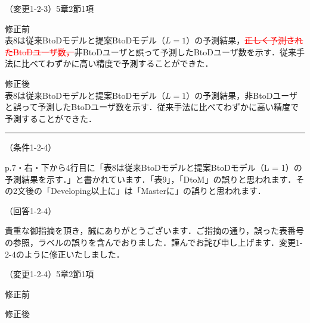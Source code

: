 \documentclass{jarticle} %
\def\subsection#1{ \vspace{1pc} {\gt #1} }
\def\nextans{ \vspace{2pc} \hrule }
\begin{document}
\subsection{（変更1-2-3）5章2節1項}
\vspace{-0.3cm}
\begin{description}
\item 修正前\\
\phantom{　}
表8は従来BtoDモデルと提案BtoDモデル（$L=1$）の予測結果，\textcolor{red}{\sout{正しく予測されたBtoDユーザ数，}}非BtoDユーザと誤って予測したBtoDユーザ数を示す．従来手法に比べてわずかに高い精度で予測することができた．
\vspace{-0.3cm}
\item 修正後\\
\phantom{　}
表8は従来BtoDモデルと提案BtoDモデル（$L=1$）の予測結果，非BtoDユーザと誤って予測したBtoDユーザ数を示す．従来手法に比べてわずかに高い精度で予測することができた．
\end{description}

\newpage
\nextans
\subsection{（条件1-2-4）}

p.7・右・下から4行目に「表8は従来BtoDモデルと提案BtoDモデル（L = 1）の予測結果を示す．」と書かれています．「表9」，「DtoM」の誤りと思われます．その2文後の「Developing以上に」は「Masterに」の誤りと思われます．

\subsection{（回答1-2-4）}

貴重な御指摘を頂き，誠にありがとうございます．ご指摘の通り，誤った表番号の参照，ラベルの誤りを含んでおりました．謹んでお詫び申し上げます．変更1-2-4のように修正いたしました．

\subsection{（変更1-2-4）5章2節1項}
\vspace{-0.3cm}
\begin{description}
\item 修正前\\
\phantom{　}
\textcolor{red}{}
\vspace{-0.3cm}
\item 修正後\\
\phantom{　}
\textcolor{red}{}
\end{description}
\end{document}
